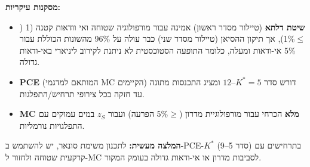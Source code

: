\documentclass[12pt,a4paper]{article}
\begin{document}
\textbf{מסקנות עיקריות:}
\begin{itemize}
  \item \textbf{שיטת דלתא} (טיילור מסדר ראשון) אמינה עבור מורפולוגיה שטוחה ואי וודאות קטנה (1%
        ($\leq$1\%{}), אך  תיקון ההסיאן (טיילור מסדר שני) כבר עולה על 96\%{} מהשונות הכוללת
        עבור 5\%{} אי-ודאות ומעלה, כלומר התופעה הסטוכסטית לא ניתנת לקירוב ליניארי באי-ודאות גדולה.
  \item \textbf{PCE} (המותאם למדגמי MC הקיימים) דורש סדר $K^*=5$--$12$ ומציג התכנסות
        מתונה עד חזקה בכל צירופי תרחיש/התפלגות.

  \item \textbf{MC מלא} הכרחי עבור מורפולוגיית מדרון ($\geq$5\%{} הפרעה) ועבור $z_S$
        במים עמוקים עם התפלגויות נורמליות.
\end{itemize}

\textbf{המלצה מעשית:} לתכנון משימת סונאר, יש להשתמש ב-PCE-$K^*$ (סדר 5--9) בתרחישים
עם קרקעית שטוחה ולחזור ל-MC לסביבות מדרון או אי-ודאות גדולה בעומק המקור.

\newpage
\end{document}
